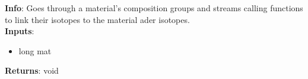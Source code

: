 \textbf{Info}: Goes through a material's composition groups and streams
calling functions to link their isotopes to the material ader isotopes.\\

\noindent \textbf{Inputs}:
\begin{itemize}
\item{long mat}
\end{itemize}

\noindent \textbf{Returns}: void
